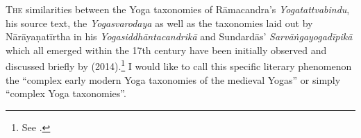 





\noindent
\lettrine[lines=2, lhang=0.2, loversize=0.25]{T}{he} similarities between the Yoga taxonomies of Rāmacandra's \textit{Yogatattvabindu}, his source text, the \textit{Yogasvarodaya} as well as the taxonomies laid out by Nārāyaṇatīrtha in his \textit{Yogasiddhāntacandrikā} and Sundardās' \textit{Sarvāṅgayogadīpikā} which all emerged within the 17th century have been initially observed and discussed briefly by \citeauthor{birch2014} (2014).\footnote{See \citeauthor[2014: 415-416]{birch2014}.} I would like to call this specific literary phenomenon the ``complex early modern Yoga taxonomies of the medieval Yogas'' or simply ``complex Yoga taxonomies''.

